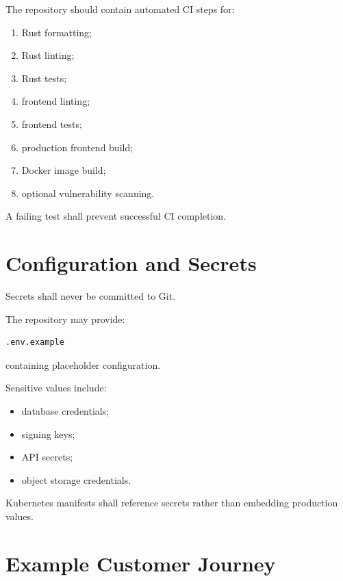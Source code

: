 \documentclass[11pt,a4paper]{article}
\begin{document}
The repository should contain automated CI steps for:

\begin{enumerate}
    \item Rust formatting;
    \item Rust linting;
    \item Rust tests;
    \item frontend linting;
    \item frontend tests;
    \item production frontend build;
    \item Docker image build;
    \item optional vulnerability scanning.
\end{enumerate}

A failing test shall prevent successful CI completion.

\section{Configuration and Secrets}

Secrets shall never be committed to Git.

The repository may provide:

\begin{lstlisting}
.env.example
\end{lstlisting}

containing placeholder configuration.

Sensitive values include:

\begin{itemize}
    \item database credentials;
    \item signing keys;
    \item API secrets;
    \item object storage credentials.
\end{itemize}

Kubernetes manifests shall reference secrets rather than embedding
production values.

\section{Example Customer Journey}
\end{document}
